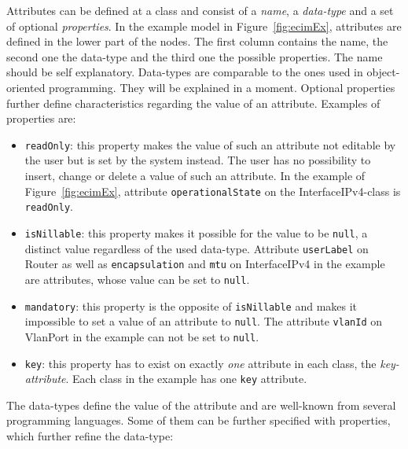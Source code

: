 Attributes can be defined at a class and consist of a \emph{name}, a \emph{data-type} and a set of optional \emph{properties}. In the example model in Figure~\ref{fig:ecimEx}, attributes are defined in the lower part of the nodes. The first column contains the name, the second one the data-type and the third one the possible properties. The name should be self explanatory. Data-types are comparable to the ones used in object-oriented programming. They will be explained in a moment. Optional properties further define characteristics regarding the value of an attribute. Examples of properties are:
\begin{itemize}
 \item \verb|readOnly|: this property makes the value of such an attribute not editable by the user but is set by the system instead. The user has no possibility to insert, change or delete a value of such an attribute. In the example of Figure~\ref{fig:ecimEx}, attribute \verb|operationalState| on the \textsf{InterfaceIPv4}-class is \verb|readOnly|.
 
 \item \verb|isNillable|: this property makes it possible for the value to be \verb|null|, a distinct value regardless of the used data-type. Attribute \verb|userLabel| on \textsf{Router} as well as \verb|encapsulation| and \verb|mtu| on \textsf{InterfaceIPv4} in the example are attributes, whose value can be set to \verb|null|.
 
 \item \verb|mandatory|: this property is the opposite of \verb|isNillable| and makes it impossible to set a value of an attribute to \verb|null|. The attribute \verb|vlanId| on \textsf{VlanPort} in the example can not be set to \verb|null|.
 
 \item \verb|key|: this property has to exist on exactly \emph{one} attribute in each class, the \emph{key-attribute}. Each class in the example has one \verb|key| attribute.
\end{itemize}

The data-types define the value of the attribute and are well-known from several programming languages. Some of them can be further specified with properties, which further refine the data-type:

